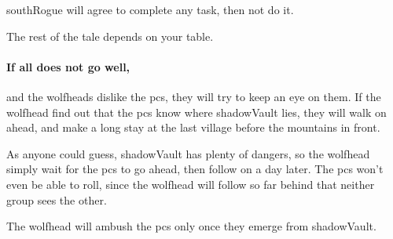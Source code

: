 \Gls{southRogue} will agree to complete any task, then not do it.

The rest of the tale depends on your table.

\paragraph{If all does not go well,}
and the \glspl{wolfhead} dislike the \glspl{pc}, they will try to keep an eye on them.
If the \gls{wolfhead} find out that the \glspl{pc} know where \gls{shadowVault} lies, they will walk on ahead, and make a long stay at the last \gls{village} before the mountains in front.

As anyone could guess, \gls{shadowVault} has plenty of dangers, so the \gls{wolfhead} simply wait for the \glspl{pc} to go ahead, then follow on a day later.
The \glspl{pc} won't even be able to roll, since the \gls{wolfhead} will follow so far behind that neither group sees the other.

The \gls{wolfhead} will ambush the \glspl{pc} only once they emerge from \gls{shadowVault}.


